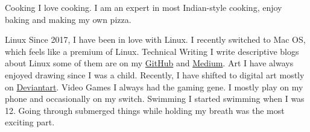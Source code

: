



\begin{cvinterests}
  \cvinterest
    {Cooking} %
    {I love cooking. I am an expert in most Indian-style cooking, enjoy baking and making my own pizza.} %

  \cvinterest
    {Linux} %
    {Since 2017, I have been in love with Linux. I recently switched to Mac OS, which feels like a premium of Linux.} %
  \cvinterest
    {Technical Writing} %
    {I write descriptive blogs about Linux some of them are on my \href{https://github.com/themagicalmammal/howtodebuntu}{GitHub} and \href{https://medium.com/@d19cyber}{Medium}.} %
  \cvinterest
    {Art} %
    {I have always enjoyed drawing since I was a child. Recently, I have shifted to digital art mostly on \href{https://www.deviantart.com/themagicalmammal}{Deviantart}.} %
  \cvinterest
    {Video Games} %
    {I always had the gaming gene. I mostly play on my phone and occasionally on my switch.} %
  \cvinterest
    {Swimming} %
    {I started swimming when I was 12. Going through submerged things while holding my breath was the most exciting part.} %

\end{cvinterests}